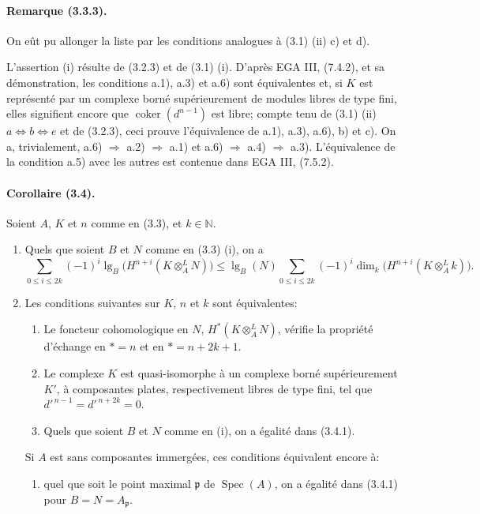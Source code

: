\documentclass[10pt]{article}
\providecommand{\N}{\mathbb N}
\providecommand{\Spec}{\operatorname{Spec}}
\providecommand{\lgop}{\operatorname{lg}}
\providecommand{\coker}{\operatorname{coker}}
\begin{document}
\paragraph{Remarque (3.3.3).} On eût pu allonger la liste par les conditions analogues à (3.1) (ii) c) et d).

L'assertion (i) résulte de (3.2.3) et de (3.1) (i). D'après EGA III, (7.4.2), et sa démonstration, les conditions a.1), a.3) et a.6) sont équivalentes et, si $K$ est représenté par un complexe borné supérieurement de modules libres de type fini, elles signifient encore que $\coker(d^{n-1})$ est libre; compte tenu de (3.1) (ii) $a\Leftrightarrow b\Leftrightarrow e$ et de (3.2.3), ceci prouve l'équivalence de a.1), a.3), a.6), b) et c). On a, trivialement, a.6) $\Rightarrow$ a.2) $\Rightarrow$ a.1) et a.6) $\Rightarrow$ a.4) $\Rightarrow$ a.3). L'équivalence de la condition a.5) avec les autres est contenue dans EGA III, (7.5.2).

\paragraph{Corollaire (3.4).} Soient $A$, $K$ et $n$ comme en (3.3), et $k\in\N$.
\begin{enumerate}[label=(\roman*)]
\item Quels que soient $B$ et $N$ comme en (3.3) (i), on a
\[
\tag{3.4.1}
\sum_{0\le i\le 2k}(-1)^i\lgop_B\bigl(H^{n+i}(K\otimes_A^L N)\bigr)
\le
\lgop_B(N)\sum_{0\le i\le 2k}(-1)^i\dim_k\bigl(H^{n+i}(K\otimes_A^L k)\bigr).
\]
\item Les conditions suivantes sur $K$, $n$ et $k$ sont équivalentes:
\begin{enumerate}[label=\alph*)]
\item Le foncteur cohomologique en $N$, $H^*(K\otimes_A^L N)$, vérifie la propriété d'échange en $*=n$ et en $*=n+2k+1$.
\item[\textup{a'}] Le complexe $K$ est quasi-isomorphe à un complexe borné supérieurement $K'$, à composantes plates, respectivement libres de type fini, tel que $d'^{\,n-1}=d'^{\,n+2k}=0$.
\item Quels que soient $B$ et $N$ comme en (i), on a égalité dans (3.4.1).
\end{enumerate}
Si $A$ est sans composantes immergées, ces conditions équivalent encore à:
\begin{enumerate}[label=\alph*),start=3]
\item quel que soit le point maximal $\mathfrak p$ de $\Spec(A)$, on a égalité dans (3.4.1) pour $B=N=A_\mathfrak p$.
\end{enumerate}
\end{enumerate}
\end{document}
